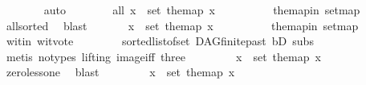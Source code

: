 \begin{isabellebody}
\ \ \ \ \ \ \isamarkupfalse%
\ auto\ \ \isanewline
\ \ \ \ \isamarkupfalse%
\ all{}{}{\isacharunderscore}{\kern0pt}{}{\isacharcolon}{\kern0pt}\ {\isachardoublequoteopen}{\isasymforall}x\ {\isasymin}\ set\ the{\isacharunderscore}{\kern0pt}map{\isachardot}{\kern0pt}\ x\ {\isasymin}\ {\isacharbraceleft}{\kern0pt}{}{\isacharcomma}{\kern0pt}{}{\isacharbraceright}{\kern0pt}{\isachardoublequoteclose}\isanewline
\ \ \ \ \ \ \isamarkupfalse%
\ the{\isacharunderscore}{\kern0pt}map{\isacharunderscore}{\kern0pt}in\ set{\isacharunderscore}{\kern0pt}map\ \isanewline
\ \ \ \ \ \ \isamarkupfalse%
\ allsorted{}{}\ \isamarkupfalse%
\ blast\ \isanewline
\ \ \ \ \isamarkupfalse%
\ {\isachardoublequoteopen}{\isasymexists}x\ {\isasymin}\ set\ the{\isacharunderscore}{\kern0pt}map{\isachardot}{\kern0pt}\ x\ {\isacharequal}{\kern0pt}\ {}{\isachardoublequoteclose}\isanewline
\ \ \ \ \ \ \isamarkupfalse%
\ the{\isacharunderscore}{\kern0pt}map{\isacharunderscore}{\kern0pt}in\ set{\isacharunderscore}{\kern0pt}map\ \isanewline
\ \ \ \ \ \ \isamarkupfalse%
\ wit{\isacharunderscore}{\kern0pt}in\ wit{\isacharunderscore}{\kern0pt}vote{}\isanewline
\ \ \ \ \ \ \ \ sorted{\isacharunderscore}{\kern0pt}list{\isacharunderscore}{\kern0pt}of{\isacharunderscore}{\kern0pt}set{\isacharparenleft}{\kern0pt}{}{\isacharparenright}{\kern0pt}\ DAG{\isachardot}{\kern0pt}finite{\isacharunderscore}{\kern0pt}past\ bD\ subs\isanewline
\ \ \ \ \ \ \isamarkupfalse%
\ {\isacharparenleft}{\kern0pt}metis\ {\isacharparenleft}{\kern0pt}no{\isacharunderscore}{\kern0pt}types{\isacharcomma}{\kern0pt}\ lifting{\isacharparenright}{\kern0pt}\ image{\isacharunderscore}{\kern0pt}iff\ three{\isacharparenright}{\kern0pt}\ \isanewline
\ \ \ \ \isamarkupfalse%
\ \isamarkupfalse%
\ {\isachardoublequoteopen}{\isasymexists}x\ {\isasymin}\ set\ the{\isacharunderscore}{\kern0pt}map{\isachardot}{\kern0pt}\ x\ {\isachargreater}{\kern0pt}\ {}{\isachardoublequoteclose}\isanewline
\ \ \ \ \ \ \isamarkupfalse%
\ zero{\isacharunderscore}{\kern0pt}less{\isacharunderscore}{\kern0pt}one\ \isamarkupfalse%
\ blast\ \isanewline
\ \ \ \ \isamarkupfalse%
\ \isamarkupfalse%
\ {\isachardoublequoteopen}{\isasymforall}x\ {\isasymin}\ set\ the{\isacharunderscore}{\kern0pt}map{\isachardot}{\kern0pt}\ x\ {\isasymge}\ {}{\isachardoublequoteclose}\ \isamarkupfalse%

\end{isabellebody}
